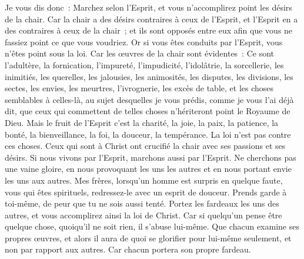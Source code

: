 \begin{multicols}{2}
Je vous dis donc~: Marchez selon l'Esprit, et vous n'accomplirez point les désirs de la chair.
Car la chair a des désirs contraires à ceux de l'Esprit, et l'Esprit en a des contraires à ceux de la chair~; et ils sont opposés entre eux afin que vous ne fassiez point ce que vous voudriez.
Or si vous êtes conduits par l'Esprit, vous n'êtes point sous la loi.
Car les œuvres de la chair sont évidentes~: Ce sont l'adultère, la fornication, l'impureté, l'impudicité,
l'idolâtrie, la sorcellerie, les inimitiés, les querelles, les jalousies, les animosités, les disputes, les divisions, les sectes,
les envies, les meurtres, l'ivrognerie, les excès de table, et les choses semblables à celles-là, au sujet desquelles je vous prédis, comme je vous l'ai déjà dit, que ceux qui commettent de telles choses n'hériteront point le Royaume de Dieu.
Mais le fruit de l'Esprit c'est la charité, la joie, la paix, la patience, la bonté, la bienveillance, la foi, la douceur, la tempérance.
La loi n'est pas contre ces choses.
Ceux qui sont à Christ ont crucifié la chair avec ses passions et ses désirs.
Si nous vivons par l'Esprit, marchons aussi par l'Esprit.
Ne cherchons pas une vaine gloire, en nous provoquant les uns les autres et en nous portant envie les uns aux autres.
\VerseOne{}Mes frères, lorsqu'un homme est surpris en quelque faute, vous qui êtes spirituels, redressez-le avec un esprit de douceur. Prends garde à toi-même, de peur que tu ne sois aussi tenté.
Portez les fardeaux les uns des autres, et vous accomplirez ainsi la loi de Christ.
Car si quelqu'un pense être quelque chose, quoiqu'il ne soit rien, il s'abuse lui-même.
Que chacun examine ses propres œuvres, et alors il aura de quoi se glorifier pour lui-même seulement, et non par rapport aux autres.
Car chacun portera son propre fardeau.

\end{multicols}
